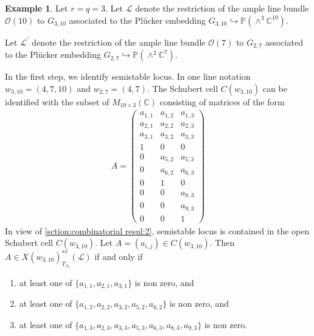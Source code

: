 \documentclass[12pt,reqno]{amsart}
\numberwithin{equation}{section}
\theoremstyle{definition}
\newtheorem{example}[theorem]{Example}
\begin{document}
\begin{example}Let $r=q=3$.  Let $\mathcal{L}$ denote the restriction of the ample line bundle $\mathcal{O}(10)$ to $G_{3,10}$ associated to the Plücker embedding
	$G_{3,10} \hookrightarrow \mathbb{P}\!\left( \wedge^{3} \mathbb{C}^{10} \right).$
	
Let $\mathcal{L}^{\prime}$ denote the restriction of the ample line bundle $\mathcal{O}(7)$ to $G_{2,7}$ associated to the Plücker embedding
$G_{2,7} \hookrightarrow \mathbb{P}\!\left( \wedge^{2} \mathbb{C}^{7} \right).$

In the first step, we identify semistable locus.
In one line notation $w_{3,10}=(4,7,10)$ and $w_{2,7}=(4,7)$.
The Schubert cell $C(w_{3,10})$ can be identified with the subset of $M_{10\times 3}(\mathbb{C})$ consisting of matrices of the form
\begin{align*}
	A=\begin{pmatrix}
		a_{1,1}&a_{1,2}&a_{1,3}\\
		a_{2,1}&a_{2,2}&a_{2,3}\\
		a_{3,1}&a_{3,2}&a_{3,3}\\
		1&0&0\\
		0&a_{5,2}&a_{5,3}\\
		0&a_{6,2}&a_{6,3}\\
		0&1&0\\
		0&0&a_{8,3}\\
		0&0&a_{9,3}\\
		0&0&1
	\end{pmatrix}
\end{align*}
 In view of \cref{sction:combinatorial resul:2}, semistable locus is contained in the open Schubert cell $C(w_{3,10})$. %
Let $A=(a_{i,j})\in C(w_{3,10})$. Then $A\in X(w_{3,10})^{ss}_{T_{J_{3}}}(\mathcal{L})$ if and only if \begin{enumerate}
	\item at least one of $\{a_{1,1}, a_{2,1}, a_{3,1}\}$ is non zero, and
	\item at least one of $\{a_{1,2},a_{2,2},a_{3,2},a_{5,2},a_{6,2}\}$ is non zero, and
	\item at least one of $\{a_{1,3},a_{2,3},a_{3,3},a_{5,3},a_{6,3},a_{8,3},a_{9,3}\}$ is non zero.
\end{enumerate}


\end{example}
\end{document}
